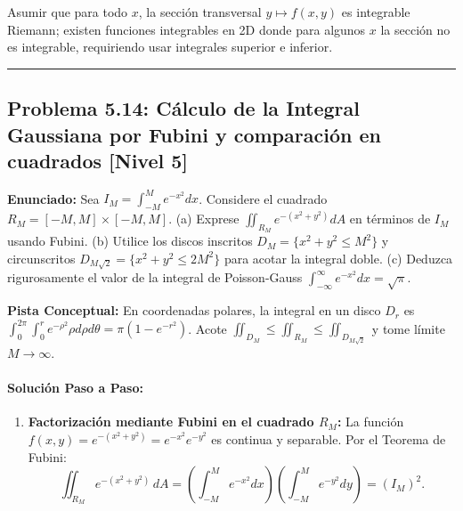 \documentclass[11pt,a4paper]{article}
\begin{document}
\begin{trapbox}
Asumir que para todo $x$, la sección transversal $y \mapsto f(x,y)$ es integrable Riemann; existen funciones integrables en 2D donde para algunos $x$ la sección no es integrable, requiriendo usar integrales superior e inferior.
\end{trapbox}

\vspace{0.5cm}
\hrule
\vspace{0.5cm}

\subsection*{Problema 5.14: Cálculo de la Integral Gaussiana por Fubini y comparación en cuadrados \hfill \color{primaryblue}\small[Nivel 5]}

\begin{tcolorbox}[colback=white,colframe=gray!40,arc=1mm,boxrule=0.5pt,left=3mm,right=3mm,top=2mm,bottom=2mm]
\textbf{Enunciado:} Sea $I_M = \int_{-M}^M e^{-x^2} dx$. Considere el cuadrado $R_M = [-M, M] \times [-M, M]$. (a) Exprese $\iint_{R_M} e^{-(x^2 + y^2)} dA$ en términos de $I_M$ usando Fubini. (b) Utilice los discos inscritos $D_M = \{x^2+y^2 \le M^2\}$ y circunscritos $D_{M\sqrt{2}} = \{x^2+y^2 \le 2M^2\}$ para acotar la integral doble. (c) Deduzca rigurosamente el valor de la integral de Poisson-Gauss $\int_{-\infty}^\infty e^{-x^2} dx = \sqrt{\pi}$.
\end{tcolorbox}

\begin{tcolorbox}[colback=yellow!4,colframe=accentamber!70,arc=1mm,boxrule=0.5pt,left=3mm,right=3mm,top=1.5mm,bottom=1.5mm]
\textbf{Pista Conceptual:} En coordenadas polares, la integral en un disco $D_r$ es $\int_0^{2\pi}\int_0^r e^{-\rho^2}\rho d\rho d\theta = \pi(1 - e^{-r^2})$. Acote $\iint_{D_M} \le \iint_{R_M} \le \iint_{D_{M\sqrt{2}}}$ y tome límite $M \to \infty$.
\end{tcolorbox}

\paragraph{Solución Paso a Paso:}\par
\begin{enumerate}[label=\textbf{\arabic*.}]
\item \textbf{Factorización mediante Fubini en el cuadrado $R_M$:}
La función $f(x,y) = e^{-(x^2 + y^2)} = e^{-x^2} e^{-y^2}$ es continua y separable.
Por el Teorema de Fubini:
\begin{equation*}
\iint_{R_M} e^{-(x^2 + y^2)} \, dA = \left(\int_{-M}^M e^{-x^2} dx\right) \left(\int_{-M}^M e^{-y^2} dy\right) = (I_M)^2.
\end{equation*}
\end{enumerate}
\end{document}
